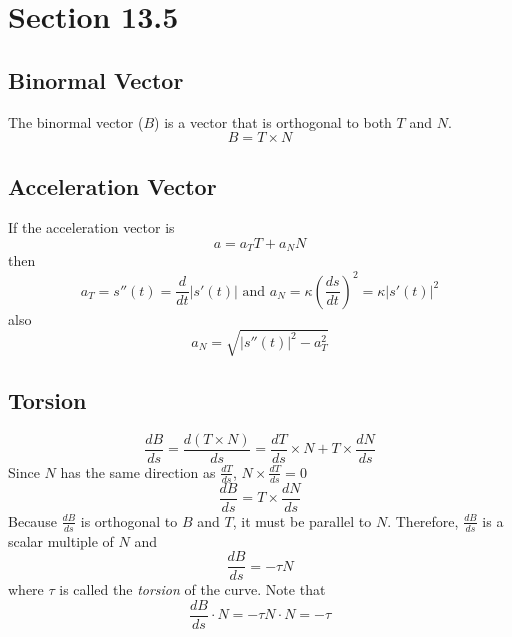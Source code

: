 \documentclass[12pt]{article}
\theoremstyle{break}
\numberwithin{theorem}{subsection}
\numberwithin{lemma}{subsection}
\numberwithin{corollary}{subsection}
\numberwithin{equation}{subsection}
\begin{document}
\section{Section 13.5}

\subsection{Binormal Vector}
The binormal vector ($B$) is a vector that is orthogonal to both $T$ and $N$. 
\begin{equation*}
B = T \times N 
\end{equation*}

\subsection{Acceleration Vector}
If the acceleration vector is 
\begin{equation*}
a = a_T T + a_N N
\end{equation*}
then 
\begin{equation*}
a_T = s''(t) = \frac{d}{dt} |s'(t)| \text{ and } a_N = \kappa \left( \frac{ds}{dt} \right)^2 = \kappa |s'(t)|^2
\end{equation*}
also
\begin{equation*}
a_N = \sqrt{|s''(t)|^2 - a_T^2}
\end{equation*}

\subsection{Torsion}
\begin{equation*}
\frac{dB}{ds} = \frac{d(T \times N)}{ds} = \frac{dT}{ds} \times N + T \times \frac{dN}{ds}
\end{equation*}
Since $N$ has the same direction as $\frac{dT}{ds}$, $N \times \frac{dT}{ds} = 0$
\begin{equation*}
\frac{dB}{ds} = T \times \frac{dN}{ds}
\end{equation*}
Because $\frac{dB}{ds}$ is orthogonal to $B$ and $T$, it must be parallel to $N$. Therefore, 
$\frac{dB}{ds}$ is a scalar multiple of $N$ and 
\begin{equation*}
\frac{dB}{ds} = -\tau N
\end{equation*}
where $\tau$ is called the \textit{torsion} of the curve. Note that 
\begin{equation*}
\frac{dB}{ds} \cdot N = -\tau N \cdot N = -\tau
\end{equation*}
\end{document}
